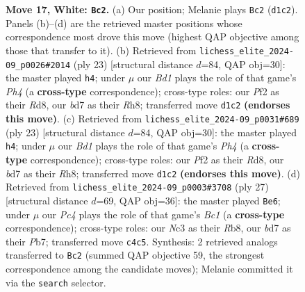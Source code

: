 \documentclass[11pt]{article}
\begin{document}
\begin{figure}[p]
\caption{\textbf{Move 17, White: \texttt{Bc2}.} (a) Our position; Melanie plays \texttt{Bc2} (\texttt{d1c2}). Panels (b)--(d) are the retrieved master positions whose correspondence most drove this move (highest QAP objective among those that transfer to it). (b) Retrieved from \texttt{lichess\_elite\_2024-09\_p0026\#2014} (ply 23) [structural distance $d$=84, QAP obj=30]: the master played \texttt{h4}; under $\mu$ our \emph{Bd1} plays the role of that game's \emph{Ph4} (a \textbf{cross-type} correspondence); cross-type roles: our \emph{P}f2 as their \emph{R}d8, our \emph{b}d7 as their \emph{R}h8; transferred move \texttt{d1c2} \textbf{(endorses this move)}. (c) Retrieved from \texttt{lichess\_elite\_2024-09\_p0031\#689} (ply 23) [structural distance $d$=84, QAP obj=30]: the master played \texttt{h4}; under $\mu$ our \emph{Bd1} plays the role of that game's \emph{Ph4} (a \textbf{cross-type} correspondence); cross-type roles: our \emph{P}f2 as their \emph{R}d8, our \emph{b}d7 as their \emph{R}h8; transferred move \texttt{d1c2} \textbf{(endorses this move)}. (d) Retrieved from \texttt{lichess\_elite\_2024-09\_p0003\#3708} (ply 27) [structural distance $d$=69, QAP obj=36]: the master played \texttt{Be6}; under $\mu$ our \emph{Pc4} plays the role of that game's \emph{Bc1} (a \textbf{cross-type} correspondence); cross-type roles: our \emph{N}c3 as their \emph{R}b8, our \emph{b}d7 as their \emph{P}b7; transferred move \texttt{c4c5}. Synthesis: 2 retrieved analogs transferred to \texttt{Bc2} (summed QAP objective 59, the strongest correspondence among the candidate moves); Melanie committed it via the \texttt{search} selector.}
\label{fig:thought-m32}
\end{figure}

\clearpage
\end{document}
